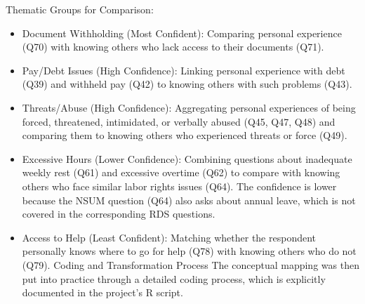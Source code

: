 \documentclass[
  12pt,
  letterpaper,
  DIV=11,
  numbers=noendperiod]{scrartcl}
\providecommand{\tightlist}{%
  \setlength{\itemsep}{0pt}\setlength{\parskip}{0pt}}
\theoremstyle{plain}
\theoremstyle{definition}
\begin{document}
{Thematic Groups for Comparison:

\begin{itemize}
\tightlist
\item
  Document Withholding (Most Confident): Comparing personal experience
  (Q70) with knowing others who lack access to their documents (Q71).
\item
  Pay/Debt Issues (High Confidence): Linking personal experience with
  debt (Q39) and withheld pay (Q42) to knowing others with such problems
  (Q43).
\item
  Threats/Abuse (High Confidence): Aggregating personal experiences of
  being forced, threatened, intimidated, or verbally abused (Q45, Q47,
  Q48) and comparing them to knowing others who experienced threats or
  force (Q49).
\item
  Excessive Hours (Lower Confidence): Combining questions about
  inadequate weekly rest (Q61) and excessive overtime (Q62) to compare
  with knowing others who face similar labor rights issues (Q64). The
  confidence is lower because the NSUM question (Q64) also asks about
  annual leave, which is not covered in the corresponding RDS questions.
\item
  Access to Help (Least Confident): Matching whether the respondent
  personally knows where to go for help (Q78) with knowing others who do
  not (Q79). Coding and Transformation Process The conceptual mapping
  was then put into practice through a detailed coding process, which is
  explicitly documented in the project's R script.
\end{itemize}

}
\end{document}
